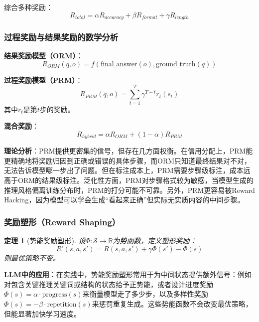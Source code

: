 \documentclass[12pt,a4paper]{article}
\newtheorem{theorem}{定理}[section]
\begin{document}
综合多种奖励：
\begin{equation}
R_{total} = \alpha R_{accuracy} + \beta R_{format} + \gamma R_{length}
\end{equation}

\subsubsection{过程奖励与结果奖励的数学分析}

\textbf{结果奖励模型（ORM）}：
\begin{equation}
R_{ORM}(q, o) = f(\text{final\_answer}(o), \text{ground\_truth}(q))
\end{equation}

\textbf{过程奖励模型（PRM）}：
\begin{equation}
R_{PRM}(q, o) = \sum_{t=1}^{T} \gamma^{T-t} r_t(s_t)
\end{equation}
其中$r_t$是第$t$步的奖励。

\textbf{混合奖励}：
\begin{equation}
R_{hybrid} = \alpha R_{ORM} + (1-\alpha) R_{PRM}
\end{equation}

\textbf{理论分析}：PRM提供更密集的信号，但存在几方面权衡。在信用分配上，PRM能更精确地将奖励归因到正确或错误的具体步骤，而ORM只知道最终结果对不对，无法告诉模型哪一步出了问题。但在标注成本上，PRM需要步骤级标注，成本远高于ORM的结果级标注。泛化性方面，PRM对步骤格式较为敏感，当模型生成的推理风格偏离训练分布时，PRM的打分可能不可靠。另外，PRM更容易被Reward Hacking，因为模型可以学会生成“看起来正确”但实际无实质内容的中间步骤。

\subsubsection{奖励塑形（Reward Shaping）}

\begin{theorem}[势能奖励塑形]
设$\Phi: \mathcal{S} \rightarrow \mathbb{R}$为势函数，定义塑形奖励：
\begin{equation}
R'(s, a, s') = R(s, a, s') + \gamma \Phi(s') - \Phi(s)
\end{equation}
则最优策略不变。
\end{theorem}

\textbf{LLM中的应用}：在实践中，势能奖励塑形常用于为中间状态提供额外信号：例如对包含关键推理关键词或结构的状态给予正势能，或者设计进度奖励$\Phi(s) = \alpha \cdot \text{progress}(s)$来衡量模型走了多少步，以及多样性奖励$\Phi(s) = -\beta \cdot \text{repetition}(s)$来惩罚重复生成。这些势能函数不会改变最优策略，但能显著加快学习速度。
\end{document}
